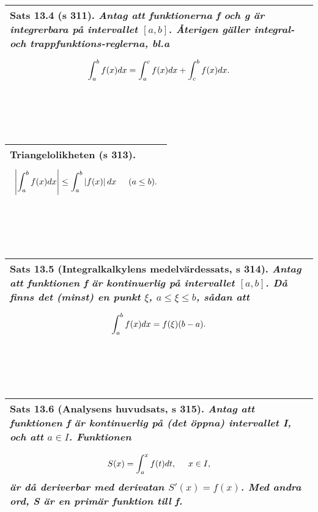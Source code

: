 \documentclass[a4paper]{article}
\newcommand\abs[1]{\left|#1\right|}
\begin{document}
\\\\\\
\begin{tabular}{|L{11.5cm}|} \hline
\textbf{Sats 13.4} (s 311).
\textit{Antag att funktionerna f och g är integrerbara på intervallet $[a,b]$. Återigen gäller integral- och trappfunktions-reglerna, bl.a}
\begin{equation*}
\renewcommand{\arraystretch}{2.5}
\begin{array}{>{\displaystyle}c}
\int_{a}^{b}f(x)dx=\int_{a}^{c}f(x)dx+\int_{c}^{b}f(x)dx.
\end{array}
\end{equation*}
\\\hline
\end{tabular}
\\\\\\
\begin{tabular}{|L{11.5cm}|} \hline
\textbf{Triangelolikheten} (s 313).
\begin{equation*}
\renewcommand{\arraystretch}{2.5}
\begin{array}{>{\displaystyle}c}
\abs{\int_{a}^{b}f(x)dx} \leq \int_{a}^{b}\abs{f(x)}dx \hspace{0.5cm} (a\leq b).
\end{array}
\end{equation*}
\\\hline
\end{tabular}
\\\\\\
\begin{tabular}{|L{11.5cm}|} \hline
\textbf{Sats 13.5} (Integralkalkylens medelvärdessats, s 314).
\textit{Antag att funktionen f är kontinuerlig på intervallet $[a,b]$. Då finns det (minst) en punkt $\xi$, $a\leq \xi \leq b$, sådan att}
\begin{equation*}
\renewcommand{\arraystretch}{2.5}
\begin{array}{>{\displaystyle}c}
\int_{a}^{b}f(x)dx=f(\xi)(b-a).
\end{array}
\end{equation*}
\\\hline
\end{tabular}
\\\\\\
\begin{tabular}{|L{11.5cm}|} \hline
\textbf{Sats 13.6} (Analysens huvudsats, s 315).
\textit{Antag att funktionen f är kontinuerlig på (det öppna) intervallet I, och att $a\in I$. Funktionen}
\begin{equation*}
\renewcommand{\arraystretch}{2.5}
\begin{array}{>{\displaystyle}c}
S(x)=\int_{a}^{x}f(t)dt, \hspace{0.5cm} x\in I,
\end{array}
\end{equation*}
\textit{är då deriverbar med derivatan $S'(x)=f(x)$. Med andra ord, S är en primär funktion till f.}
\\\hline
\end{tabular}
\end{document}
